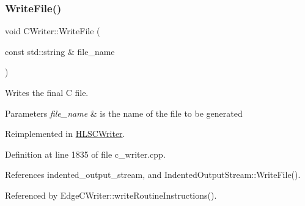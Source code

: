 \subsubsection{\texorpdfstring{Write\+File()}{WriteFile()}}
{\footnotesize\ttfamily void C\+Writer\+::\+Write\+File (\begin{DoxyParamCaption}\item[{const std\+::string \&}]{file\+\_\+name }\end{DoxyParamCaption})\hspace{0.3cm}{\ttfamily [virtual]}}



Writes the final C file. 


\begin{DoxyParams}{Parameters}
{\em file\+\_\+name} & is the name of the file to be generated \\
\hline
\end{DoxyParams}


Reimplemented in \hyperlink{classHLSCWriter_a5956dd91971c6fca646d0f714afd6795}{H\+L\+S\+C\+Writer}.



Definition at line 1835 of file c\+\_\+writer.\+cpp.



References indented\+\_\+output\+\_\+stream, and Indented\+Output\+Stream\+::\+Write\+File().



Referenced by Edge\+C\+Writer\+::write\+Routine\+Instructions().


